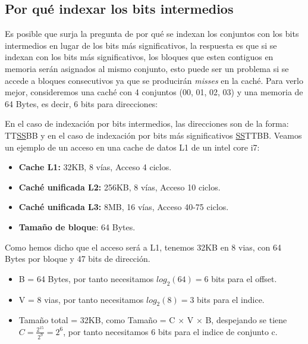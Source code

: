 \subsection{Por qué indexar los bits intermedios}
Es posible que surja la pregunta de por qué se indexan los conjuntos con los bits intermedios en lugar de los bits más significativos,
la respuesta es que si se indexan con los bits más significativos, los bloques que esten contiguos en memoria serán asignados al mismo conjunto, 
esto puede ser un problema si se accede a bloques consecutivos ya que se producirán \textit{misses} en la caché. Para verlo mejor, consideremos
una caché con 4 conjuntos (00, 01, 02, 03) y una memoria de 64 Bytes, es decir, 6 bits para direcciones:
\begin{center}
    
\end{center}
En el caso de indexación por bits intermedios, las direcciones son de la forma: TT\underline{SS}BB y en el caso de indexación por bits más significativos
\underline{SS}TTBB.
Veamos un ejemplo de un acceso en una cache de datos L1 de un intel core i7:
\begin{center}
    \begin{minipage}{0.6\textwidth}
        
    \end{minipage}
    \begin{minipage}{0.3\textwidth}
        \begin{itemize}
            \item \textbf{Cache L1:} 32KB, 8 vías, Acceso 4 ciclos.
            \item \textbf{Caché unificada L2:} 256KB, 8 vías, Acceso 10 ciclos.
            \item \textbf{Caché unificada L3:} 8MB, 16 vías, Acceso 40-75 ciclos.
            \item \textbf{Tamaño de bloque}: 64 Bytes.
        \end{itemize}
    \end{minipage}
\end{center}
Como hemos dicho que el acceso será a L1, tenemos 32KB en 8 vias, con 64 Bytes por bloque y 47 bits de dirección.
\begin{itemize}
    \item B = 64 Bytes, por tanto necesitamos $log_2(64) = 6$ bits para el offset.
    \item V = 8 vias, por tanto necesitamos $log_2(8) = 3$ bits para el indice.
    \item Tamaño total = 32KB, como Tamaño = C $\times$ V $\times$ B, despejando se tiene $C = \frac{2^{15}}{2^9} = 2^6$, por tanto necesitamos 6 bits para el indice de conjunto c.
\end{itemize}
